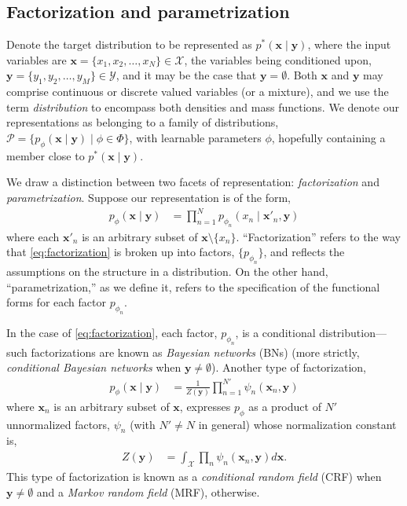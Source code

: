 
\subsection{Factorization and parametrization}
Denote the target distribution to be represented as $p^*(\mathbf{x}\mid\mathbf{y})$, where the input variables are $\mathbf{x}=\{x_1,x_2,\ldots,x_N\}\in\mathcal{X}$, the variables being conditioned upon, $\mathbf{y}=\{y_1,y_2,\ldots,y_M\}\in\mathcal{Y}$, and it may be the case that $\mathbf{y}=\emptyset$. Both $\mathbf{x}$ and $\mathbf{y}$ may comprise continuous or discrete valued variables (or a mixture), and we use the term \emph{distribution} to encompass both densities and mass functions. We denote our representations as belonging to a family of distributions, $\mathcal{P}=\{p_\phi(\mathbf{x}\mid\mathbf{y})\mid\phi\in\Phi\}$, with learnable parameters $\phi$, hopefully containing a member close to $p^*(\mathbf{x}\mid\mathbf{y})$.

We draw a distinction between two facets of representation: \emph{factorization} and \emph{parametrization}. Suppose our representation is of the form,
\begin{align}\label{eq:factorization}
	p_\phi(\mathbf{x}\mid\mathbf{y}) &= \prod_{n=1}^Np_{\phi_n}(x_n\mid\mathbf{x}'_n,\mathbf{y})
\end{align}
where each $\mathbf{x}'_n$ is an arbitrary subset of $\mathbf{x}\setminus\{x_n\}$. ``Factorization'' refers to the way that \eqref{eq:factorization} is broken up into factors, $\{p_{\phi_n}\}$, and reflects the assumptions on the structure in a distribution. On the other hand, ``parametrization,'' as we define it, refers to the specification of the functional forms for each factor $p_{\phi_n}$.

In the case of \eqref{eq:factorization}, each factor, $p_{\phi_n}$, is a conditional distribution---such factorizations are known as \emph{Bayesian networks} (BNs) (more strictly, \emph{conditional Bayesian networks} when $\mathbf{y}\neq\emptyset$). Another type of factorization,
\begin{align}\label{eq:conditional-mf}
	p_\phi(\mathbf{x}\mid\mathbf{y}) &= \frac{1}{Z(\mathbf{y})}\prod_{n=1}^{N'}\psi_n(\mathbf{x}_n,\mathbf{y})
\end{align}
where $\mathbf{x}_n$ is an arbitrary subset of $\mathbf{x}$, expresses $p_\phi$ as a product of $N'$ unnormalized factors, $\psi_n$ (with $N'\neq N$ in general) whose normalization constant is,
\begin{align}
	Z(\mathbf{y}) &= \int_\mathcal{X}\prod_n\psi_n(\mathbf{x}_n,\mathbf{y})d\mathbf{x}.
\end{align}
This type of factorization is known as a \emph{conditional random field} (CRF) when $\mathbf{y}\neq\emptyset$ and a \emph{Markov random field} (MRF), otherwise.

